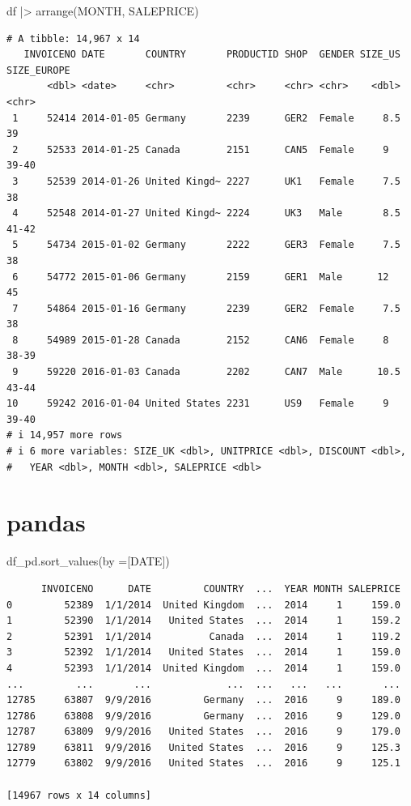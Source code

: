 \documentclass[
  letterpaper,
  DIV=11,
  numbers=noendperiod]{scrreprt}
\newenvironment{Shaded}{\begin{snugshade}}{\end{snugshade}}
\newcommand{\FunctionTok}[1]{\textcolor[rgb]{0.28,0.35,0.67}{#1}}
\newcommand{\NormalTok}[1]{\textcolor[rgb]{0.00,0.23,0.31}{#1}}
\newcommand{\OperatorTok}[1]{\textcolor[rgb]{0.37,0.37,0.37}{#1}}
\newcommand{\SpecialCharTok}[1]{\textcolor[rgb]{0.37,0.37,0.37}{#1}}
\newcommand{\StringTok}[1]{\textcolor[rgb]{0.13,0.47,0.30}{#1}}
\begin{document}
\begin{Shaded}
\begin{Highlighting}[]
\NormalTok{df }\SpecialCharTok{|\textgreater{}}
    \FunctionTok{arrange}\NormalTok{(MONTH, SALEPRICE)     }
\end{Highlighting}
\end{Shaded}

\begin{verbatim}
# A tibble: 14,967 x 14
   INVOICENO DATE       COUNTRY       PRODUCTID SHOP  GENDER SIZE_US SIZE_EUROPE
       <dbl> <date>     <chr>         <chr>     <chr> <chr>    <dbl> <chr>      
 1     52414 2014-01-05 Germany       2239      GER2  Female     8.5 39         
 2     52533 2014-01-25 Canada        2151      CAN5  Female     9   39-40      
 3     52539 2014-01-26 United Kingd~ 2227      UK1   Female     7.5 38         
 4     52548 2014-01-27 United Kingd~ 2224      UK3   Male       8.5 41-42      
 5     54734 2015-01-02 Germany       2222      GER3  Female     7.5 38         
 6     54772 2015-01-06 Germany       2159      GER1  Male      12   45         
 7     54864 2015-01-16 Germany       2239      GER2  Female     7.5 38         
 8     54989 2015-01-28 Canada        2152      CAN6  Female     8   38-39      
 9     59220 2016-01-03 Canada        2202      CAN7  Male      10.5 43-44      
10     59242 2016-01-04 United States 2231      US9   Female     9   39-40      
# i 14,957 more rows
# i 6 more variables: SIZE_UK <dbl>, UNITPRICE <dbl>, DISCOUNT <dbl>,
#   YEAR <dbl>, MONTH <dbl>, SALEPRICE <dbl>
\end{verbatim}

\section{pandas}

\begin{Shaded}
\begin{Highlighting}[]
\NormalTok{df\_pd.sort\_values(by }\OperatorTok{=}\NormalTok{[}\StringTok{\textquotesingle{}DATE\textquotesingle{}}\NormalTok{])   }
\end{Highlighting}
\end{Shaded}

\begin{verbatim}
      INVOICENO      DATE         COUNTRY  ...  YEAR MONTH SALEPRICE
0         52389  1/1/2014  United Kingdom  ...  2014     1     159.0
1         52390  1/1/2014   United States  ...  2014     1     159.2
2         52391  1/1/2014          Canada  ...  2014     1     119.2
3         52392  1/1/2014   United States  ...  2014     1     159.0
4         52393  1/1/2014  United Kingdom  ...  2014     1     159.0
...         ...       ...             ...  ...   ...   ...       ...
12785     63807  9/9/2016         Germany  ...  2016     9     189.0
12786     63808  9/9/2016         Germany  ...  2016     9     129.0
12787     63809  9/9/2016   United States  ...  2016     9     179.0
12789     63811  9/9/2016   United States  ...  2016     9     125.3
12779     63802  9/9/2016   United States  ...  2016     9     125.1

[14967 rows x 14 columns]
\end{verbatim}
\end{document}
